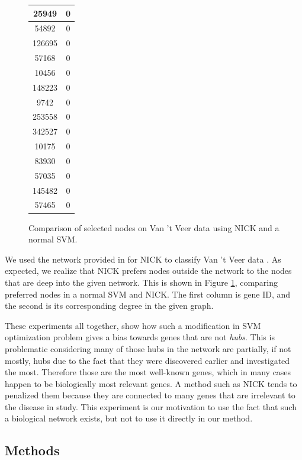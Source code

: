 \begin{figure}[!ht]
{\begin{tabular}{| c c |}
        25949  &  0 \\ \hline 
        54892  &  0 \\ \hline 
        126695  &  0 \\ \hline 
        57168  &  0 \\ \hline 
        10456  &  0 \\ \hline 
        148223  &  0 \\ \hline 
        9742  &  0 \\ \hline 
        253558  &  0 \\ \hline 
        342527  &  0 \\ \hline 
        10175  &  0 \\ \hline 
        83930  &  0 \\ \hline 
        57035  &  0 \\ \hline 
        145482  &  0 \\ \hline 
        57465  &  0 \\ \hline 
      \end{tabular}
  }
  \caption{Comparison of selected nodes on Van 't Veer data \cite{van2002gene} using NICK and a normal SVM.}
  \label{tbl:nick-realdata}
\end{figure}

We used the network provided in \cite{barabasi2004network} for NICK to classify Van 't Veer data \cite{van2002gene}. As expected, we realize that NICK prefers nodes outside the network to the nodes that are deep into the given network. This is shown in Figure \ref{tbl:nick-realdata}, comparing preferred nodes in a normal SVM and NICK. The first column is gene ID, and the second is its corresponding degree in the given graph.

These experiments all together, show how such a modification in SVM optimization problem gives a bias towards genes that are not \emph{hubs}. This is problematic considering many of those hubs in the network are partially, if not mostly, hubs due to the fact that they were discovered earlier and investigated the most. Therefore those are the most well-known genes, which in many cases happen to be biologically most relevant genes. A method such as NICK tends to penalized them because they are connected to many genes that are irrelevant to the disease in study. This experiment is our motivation to use the fact that such a biological network exists, but not to use it directly in our method.


\subsection{Methods}
